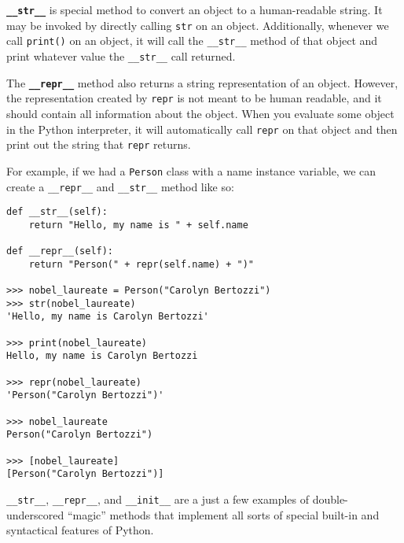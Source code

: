 \textbf{\lstinline{__str__}} is special method to convert an object to a human-readable string. It may be invoked by directly calling \lstinline{str} on an object. Additionally, whenever we call \lstinline{print()} on an object, it will call the \lstinline{__str__} method of that object and print whatever value the \lstinline{__str__} call returned. 

The \textbf{\lstinline{__repr__}} method also returns a string representation of an object. However, the representation created by \lstinline{repr} is not meant to be human readable, and it should contain all information about the object. When you evaluate some object in the Python interpreter, it will automatically call \lstinline{repr} on that object and then print out the string that \lstinline{repr} returns. 

For example, if we had a \lstinline{Person} class with a name instance variable, we can create a \lstinline{__repr__} and \lstinline{__str__} method like so:
\begin{lstlisting}
def __str__(self):
    return "Hello, my name is " + self.name

def __repr__(self):
    return "Person(" + repr(self.name) + ")"

>>> nobel_laureate = Person("Carolyn Bertozzi")
>>> str(nobel_laureate)
'Hello, my name is Carolyn Bertozzi'

>>> print(nobel_laureate)          
Hello, my name is Carolyn Bertozzi

>>> repr(nobel_laureate)
'Person("Carolyn Bertozzi")'

>>> nobel_laureate
Person("Carolyn Bertozzi")

>>> [nobel_laureate]
[Person("Carolyn Bertozzi")]
\end{lstlisting}

\lstinline{__str__}, \lstinline{__repr__}, and \lstinline{__init__} are a just a few examples of double-underscored ``magic'' methods that implement all sorts of special built-in and syntactical features of Python. 
